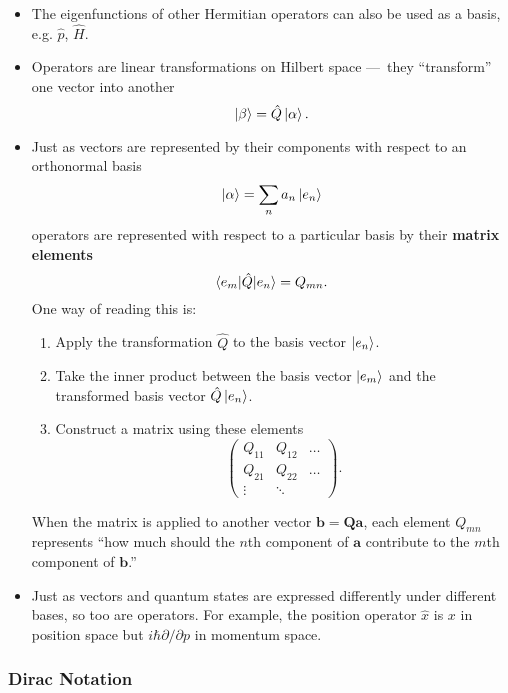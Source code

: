 \documentclass{article}
\renewcommand{\vec}[1]{\boldsymbol{\mathbf{#1}}}
\begin{document}
\begin{itemize}
  \item The eigenfunctions of other Hermitian operators can also be used as a basis, e.g. $\hat{p}$, $\hat{H}$.

  \item Operators are linear transformations on Hilbert space — they ``transform'' one vector into another \[\ket{\beta} = \hat{Q} \ket{\alpha}.\]

  \item Just as vectors are represented by their components with respect to an orthonormal basis \[\ket{\alpha} = \sum_n a_n \ket{e_n}\] operators are represented with respect to a particular basis by their \textbf{matrix elements} \[\braket{e_m | \hat{Q} | e_n} = Q_{m n}.\] One way of reading this is:

        \begin{enumerate}
          \item Apply the transformation $\hat{Q}$ to the basis vector $\ket{e_n}$.

          \item Take the inner product between the basis vector $\ket{e_m}$ and the transformed basis vector $\hat{Q} \ket{e_n}$.

          \item Construct a matrix using these elements \[\begin{pmatrix}
                    Q_{1 1} & Q_{1 2} & \ldots \\
                    Q_{2 1} & Q_{2 2} & \ldots \\
                    \vdots  & \ddots
                  \end{pmatrix}.\]
        \end{enumerate}

        When the matrix is applied to another vector $\vec{b} = \vec{Q} \vec{a}$, each element $Q_{m n}$ represents ``how much should the $n$th component of $\vec{a}$ contribute to the $m$th component of $\vec{b}$.''

  \item Just as vectors and quantum states are expressed differently under different bases, so too are operators. For example, the position operator $\hat{x}$ is $x$ in position space but $i \hbar \partial / \partial p$ in momentum space.
\end{itemize}

\subsubsection{Dirac Notation}
\end{document}
